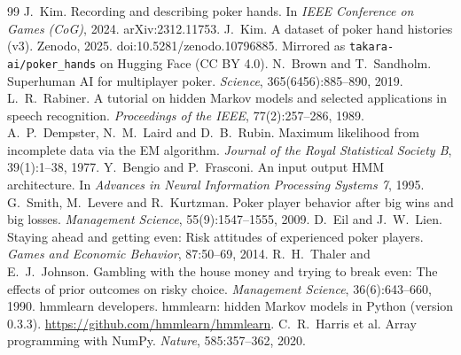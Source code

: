 \begin{thebibliography}{99}
\small
{} J.~Kim. Recording and describing poker hands. In \emph{IEEE Conference on Games (CoG)}, 2024. arXiv:2312.11753.
 J.~Kim. A dataset of poker hand histories (v3). Zenodo, 2025. doi:10.5281/zenodo.10796885. Mirrored as \texttt{takara-ai/poker\_hands} on Hugging Face (CC BY 4.0).
 N.~Brown and T.~Sandholm. Superhuman AI for multiplayer poker. \emph{Science}, 365(6456):885--890, 2019.
 L.~R.~Rabiner. A tutorial on hidden Markov models and selected applications in speech recognition. \emph{Proceedings of the IEEE}, 77(2):257--286, 1989.
 A.~P.~Dempster, N.~M.~Laird and D.~B.~Rubin. Maximum likelihood from incomplete data via the EM algorithm. \emph{Journal of the Royal Statistical Society B}, 39(1):1--38, 1977.
 Y.~Bengio and P.~Frasconi. An input output HMM architecture. In \emph{Advances in Neural Information Processing Systems 7}, 1995.
 G.~Smith, M.~Levere and R.~Kurtzman. Poker player behavior after big wins and big losses. \emph{Management Science}, 55(9):1547--1555, 2009.
 D.~Eil and J.~W.~Lien. Staying ahead and getting even: Risk attitudes of experienced poker players. \emph{Games and Economic Behavior}, 87:50--69, 2014.
 R.~H.~Thaler and E.~J.~Johnson. Gambling with the house money and trying to break even: The effects of prior outcomes on risky choice. \emph{Management Science}, 36(6):643--660, 1990.
 hmmlearn developers. hmmlearn: hidden Markov models in Python (version 0.3.3). \url{https://github.com/hmmlearn/hmmlearn}.
 C.~R.~Harris et al. Array programming with NumPy. \emph{Nature}, 585:357--362, 2020.
\end{thebibliography}
